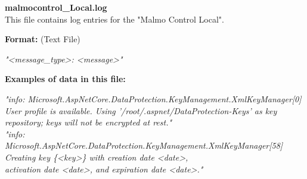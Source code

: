 \begin{description}
\begin{addmargin}[0em]{0em}
    \label{malmocontrol_Local.log}
    \begin{addmargin}[1em]{0em} %
        \textbf{malmocontrol\_Local.log}\\
        This file contains log entries for the "Malmo Control Local".
        \begin{addmargin}[1em]{0em}
            \textbf{Format:} (Text File)
            \begin{addmargin}[1em]{0em}
                \textit{"<message\_type>: <message>"}
            \end{addmargin}
        \end{addmargin}
        \begin{addmargin}[1em]{0em}
            \textbf{Examples of data in this file:}
            \begin{addmargin}[1em]{0em}\textit{"info: Microsoft.AspNetCore.DataProtection.KeyManagement.XmlKeyManager[0]\\
                User profile is available. Using '/root/.aspnet/DataProtection-Keys' as key repository; keys will not be encrypted at rest."\\
                "info: Microsoft.AspNetCore.DataProtection.KeyManagement.XmlKeyManager[58]\\
                Creating key \{<key>\} with creation date <date>,\\
                activation date <date>, and expiration date <date>."}
            \end{addmargin}
        \end{addmargin}
    \end{addmargin} %
    \textbf{\\}


\end{addmargin}
\end{description}
